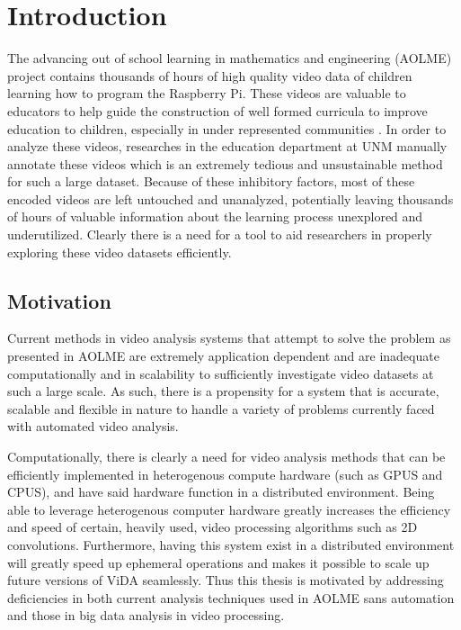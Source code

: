 \chapter{Introduction}
The advancing out of school learning in mathematics and engineering (AOLME)
project contains thousands of hours of high quality video data of children
learning how to program the Raspberry Pi. These videos are valuable to educators
to help guide the construction of well formed curricula to improve education to
children, especially in under represented communities \cite{LopezLeiva2016}. In
order to analyze these videos, researches in the education department at UNM
manually annotate these videos which is an extremely tedious and unsustainable
method for such a large dataset. Because of these inhibitory factors, most of
these encoded videos are left untouched and unanalyzed, potentially leaving
thousands of hours of valuable information about the learning process unexplored
and  underutilized. Clearly there is a need for a tool to aid researchers in
properly exploring these video datasets efficiently.

\section{\label{section:motivation}Motivation}

Current methods in video analysis systems that attempt to solve the problem  as
presented in AOLME are extremely application dependent and are inadequate
computationally and in scalability to sufficiently investigate video datasets at such
a large scale. As such, there is a propensity for a system that is accurate,
scalable and flexible in nature to handle a variety of problems currently faced
with automated video analysis.

Computationally, there is clearly a need for video analysis methods that can be
efficiently implemented in heterogenous compute hardware (such as GPUS and
CPUS), and have said hardware function in a distributed environment. Being able
to leverage heterogenous computer hardware greatly increases the efficiency and
speed of certain, heavily used, video processing algorithms such as 2D
convolutions. Furthermore, having this system exist in a distributed environment
will greatly speed up ephemeral operations and makes it possible to scale up
future versions of ViDA seamlessly. Thus this thesis is motivated
by addressing deficiencies in both current analysis techniques used in AOLME sans
automation and those in big data analysis in video processing.

